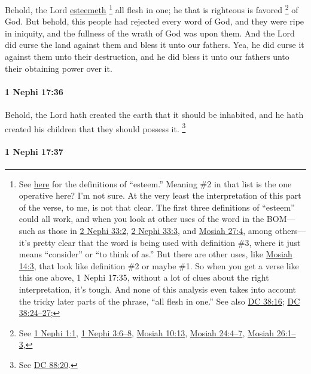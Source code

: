 			Behold, the Lord \hyperref[ESTEEM]{esteemeth}%
				\footnote{%
					\label{1NEPHI-17-35-NOTE-esteem}%
					See \hyperref[ESTEEM-1828]{here} for the definitions of ``esteem.'' Meaning \#2 in that list is the one operative here? I'm not sure. At the very least the interpretation of this part of the verse, to me, is not that clear. The first three definitions of ``esteem'' could all work, and when you look at other uses of the word in the BOM---such as those in \hyperref[2NEPHI-33-2]{2 Nephi 33:2}, \hyperref[2NEPHI-33-3]{2 Nephi 33:3}, and \hyperref[MOSIAH-27-4]{Mosiah 27:4}, among others---it's pretty clear that the word is being used with definition \#3, where it just means ``consider'' or ``to think of as.'' But there are other uses, like \hyperref[MOSIAH-14-3]{Mosiah 14:3}, that look like definition \#2 or maybe \#1. So when you get a verse like this one above, 1 Nephi 17:35, without a lot of clues about the right interpretation, it's tough. And none of this analysis even takes into account the tricky later parts of the phrase, ``all flesh in one.''
					See also \hyperref[DC38-16]{DC 38:16}; \hyperref[DC38-24]{DC 38:24--27};
					}
			all flesh in one;
			he that is righteous is favored%
				\footnote{%
					See \hyperref[1NEPHI-1-1]{1 Nephi 1:1}, \hyperref[1NEPHI-3-6]{1 Nephi 3:6--8}, \hyperref[MOSIAH-10-13]{Mosiah 10:13}, \hyperref[MOSIAH-24-4]{Mosiah 24:4--7}, \hyperref[MOSIAH-26-1]{Mosiah 26:1--3},
					}
			of God.
			But behold, this people had rejected every word of God,
			and they were ripe in iniquity,
			and the fullness of the wrath of God was upon them.
			And the Lord did curse the land against them
			and bless it unto our fathers.
			Yea, he did curse it against them unto their destruction,
			and he did bless it unto our fathers
			unto their obtaining power over it.

		\paragraph{1 Nephi 17:36} %
			\label{1NEPHI-17-36}

			Behold, the Lord hath created the earth that it should be inhabited,
			and he hath created his children that they should possess it.%
				\footnote{%
					See \hyperref[DC88-20]{DC 88:20}.
					}

		\paragraph{1 Nephi 17:37} %
			\label{1NEPHI-17-37}

